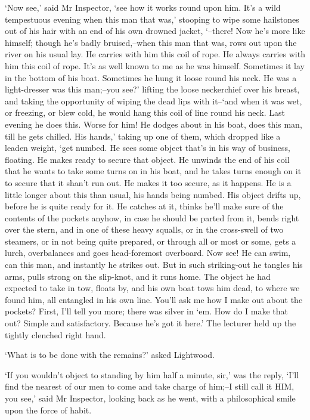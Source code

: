 ‘Now see,’ said Mr Inspector, ‘see how it works round upon him. It’s a
wild tempestuous evening when this man that was,’ stooping to wipe
some hailstones out of his hair with an end of his own drowned jacket,
‘--there! Now he’s more like himself; though he’s badly bruised,--when
this man that was, rows out upon the river on his usual lay. He carries
with him this coil of rope. He always carries with him this coil of
rope. It’s as well known to me as he was himself. Sometimes it lay in
the bottom of his boat. Sometimes he hung it loose round his neck.
He was a light-dresser was this man;--you see?’ lifting the loose
neckerchief over his breast, and taking the opportunity of wiping the
dead lips with it--‘and when it was wet, or freezing, or blew cold, he
would hang this coil of line round his neck. Last evening he does this.
Worse for him! He dodges about in his boat, does this man, till he gets
chilled. His hands,’ taking up one of them, which dropped like a leaden
weight, ‘get numbed. He sees some object that’s in his way of business,
floating. He makes ready to secure that object. He unwinds the end of
his coil that he wants to take some turns on in his boat, and he takes
turns enough on it to secure that it shan’t run out. He makes it too
secure, as it happens. He is a little longer about this than usual, his
hands being numbed. His object drifts up, before he is quite ready for
it. He catches at it, thinks he’ll make sure of the contents of the
pockets anyhow, in case he should be parted from it, bends right over
the stern, and in one of these heavy squalls, or in the cross-swell of
two steamers, or in not being quite prepared, or through all or most or
some, gets a lurch, overbalances and goes head-foremost overboard. Now
see! He can swim, can this man, and instantly he strikes out. But in
such striking-out he tangles his arms, pulls strong on the slip-knot,
and it runs home. The object he had expected to take in tow, floats by,
and his own boat tows him dead, to where we found him, all entangled
in his own line. You’ll ask me how I make out about the pockets? First,
I’ll tell you more; there was silver in ‘em. How do I make that out?
Simple and satisfactory. Because he’s got it here.’ The lecturer held up
the tightly clenched right hand.

‘What is to be done with the remains?’ asked Lightwood.

‘If you wouldn’t object to standing by him half a minute, sir,’ was
the reply, ‘I’ll find the nearest of our men to come and take charge of
him;--I still call it HIM, you see,’ said Mr Inspector, looking back as
he went, with a philosophical smile upon the force of habit.

